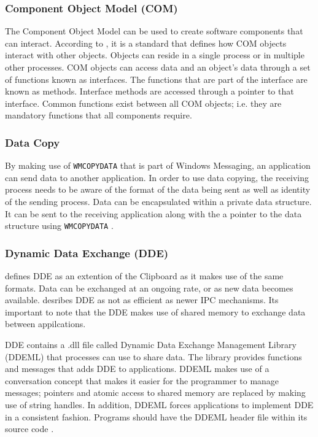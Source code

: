 \documentclass[12pt] {newrucsthesis}    %
\def\code#1{\texttt{#1}}
\begin{document}
        \subsubsection{Component Object Model (COM)}
          The Component Object Model can be used to create software components that can interact.
          According to \cite{MSDN_API}, it is a standard that defines how COM objects interact with other
          objects. Objects can reside in a single process or in multiple other processes. COM objects can
          access data and an object's data through a set of functions known as interfaces. The functions that
          are part of the interface are known as methods. Interface methods are accessed through a pointer to
          that interface. Common functions exist between all COM objects; i.e. they are mandatory
          functions that all components require.

        \subsubsection{Data Copy}
          By making use of \code{WMCOPYDATA} that is part of Windows Messaging, an application can
          send data to another application. In order to use data copying, the receiving process needs
          to be aware of the format of the data being sent as well as identity of the sending process.
          Data can be encapsulated within a private data structure. It can be sent to the receiving application
          along with the a pointer to the data structure using \code{WMCOPYDATA} \citep{MSDN_API}.

        \subsubsection{Dynamic Data Exchange (DDE)}
          \cite{MSDN_API} defines DDE as an extention of the Clipboard as it makes use of the same formats.
          Data can be exchanged at an ongoing rate, or as new data becomes available. \cite{MSDN_API} desribes
          DDE as not as efficient as newer IPC mechanisms. Its important to note that the DDE makes use of shared
          memory to exchange data between appilcations.

          DDE contains a .dll file called Dynamic Data Exchange Management Library (DDEML) that processes
          can use to share data. The library provides functions and messages that adds DDE to applications.
          DDEML makes use of a conversation concept that makes it easier for the programmer to manage messages; pointers and atomic access to
          shared memory are replaced by making use of string handles. In addition, DDEML forces applications to implement DDE in a
          consistent fashion. Programs should have the DDEML header file within its source code \citep{MSDN_API}.
\end{document}
